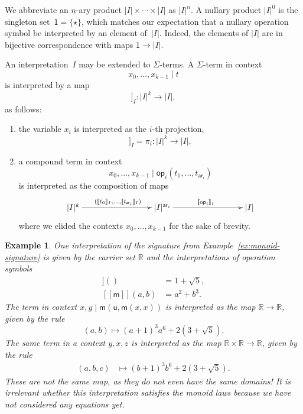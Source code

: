 \documentclass{amsart}
\newcommand{\RR}{\mathbb{R}} %
\newcommand{\op}[1]{\mathsf{op}_{#1}} %
\newcommand{\arity}[1]{\mathsf{ar}_{#1}} %
\newcommand{\one}{\mathsf{1}} %
\newcommand{\sem}[1]{[\![#1]\!]} %
\newtheorem{example}[definition]{Example}
\begin{document}
We abbreviate an $n$-ary product $|I| \times \cdots \times |I|$ as $|I|^n$. A nullary product
$|I|^0$ is the singleton set~$\one = \{\star\}$, which matches our expectation that a
nullary operation symbol be interpreted by an element of~$|I|$. Indeed, the elements of $|I|$
are in bijective correspondence with maps $\one \to |I|$.

An interpretation~$I$ may be extended to $\Sigma$-terms. A $\Sigma$-term in context
%
\begin{equation*}
  x_0, \ldots, x_{k-1} \mid t
\end{equation*}
%
is interpreted by a map
%
\begin{equation*}
  \sem{x_0, \ldots, x_{k-1} \mid t}_I : |I|^k \to |I|,
\end{equation*}
%
as follows:
%
\begin{enumerate}
\item the variable $x_i$ is interpreted as the $i$-th projection,
  \begin{equation*}
    \sem{x_0, \ldots, x_{k-1} \mid  x_i}_I = \pi_i : |I|^k \to |I|,
  \end{equation*}
\item a compound term in context
  \begin{equation*}
    x_0, \ldots, x_{k-1} \mid \op{i}(t_1, \ldots, t_{\arity{i}})
  \end{equation*}
  is interpreted as the composition of maps
  \begin{equation*}
    \xymatrix@+6em{
      {|I|^k} \ar[r]^{(\sem{t_0}_I, \ldots, \sem{t_{\arity{i}}}_I)}
      &
      {|I|^{\arity{i}}} \ar[r]^{\sem{\op{i}}_I}
      &
      {|I|}
    }
  \end{equation*}
  where we elided the contexts $x_0, \ldots, x_{k-1}$ for the sake of brevity.
\end{enumerate}

\begin{example}
  One interpretation of the signature from Example~\ref{ex:monoid-signature} is given by
  the carrier set $\RR$ and the interpretations of operation symbols
  \begin{align*}
    \sem{\mathsf{u}}() &= 1 + \sqrt{5}, \\
    \sem{\mathsf{m}}(a, b) &= a^2 + b^3.
  \end{align*}
  The term in context $x, y \mid \mathsf{m}(\mathsf{u}, \mathsf{m}(x, x))$ is interpreted
  as the map $\RR \to \RR$, given by the rule
  \begin{equation*}
    (a, b) \mapsto (a+1)^3 a^6 + 2 (3 + \sqrt{5}).
  \end{equation*}
  The same term in a context $y, x, z$ is interpreted as the map $\RR \times \RR \to \RR$,
  given by the rule
  \begin{align*}
    (a, b, c) &\mapsto (b+1)^3 b^6 + 2 (3 + \sqrt{5}).
  \end{align*}
  These are not the same map, as they do not even have the same domains! It is irrelevant
  whether this interpretation satisfies the monoid laws because we have not considered any
  equations yet.
\end{example}
\end{document}
